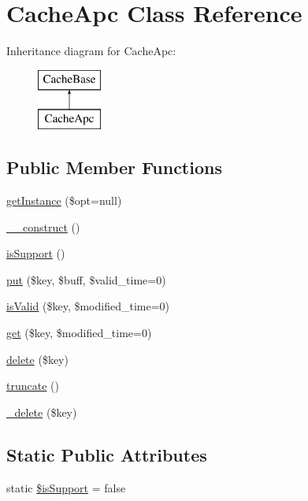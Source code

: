 \hypertarget{classCacheApc}{\section{Cache\-Apc Class Reference}
\label{classCacheApc}
}
Inheritance diagram for Cache\-Apc\-:\begin{figure}[H]
\begin{center}
\leavevmode
\includegraphics[height=2.000000cm]{classCacheApc}
\end{center}
\end{figure}
\subsection*{Public Member Functions}
\begin{DoxyCompactItemize}
\item 
\hyperlink{classCacheApc_ab175f6bbdebb9ce327c019c3be313331}{get\-Instance} (\$opt=null)
\item 
\hyperlink{classCacheApc_a3be647fd11c33de4fc5165e7840df318}{\-\_\-\-\_\-construct} ()
\item 
\hyperlink{classCacheApc_abd38db973d6d7188606a726d7a5fcc40}{is\-Support} ()
\item 
\hyperlink{classCacheApc_abdfbacf78bd79a1339b0fd37d97f399e}{put} (\$key, \$buff, \$valid\-\_\-time=0)
\item 
\hyperlink{classCacheApc_ae915c4aded713867d7fab9b691ab5795}{is\-Valid} (\$key, \$modified\-\_\-time=0)
\item 
\hyperlink{classCacheApc_ae4b086e28a3b2820174641e964844ceb}{get} (\$key, \$modified\-\_\-time=0)
\item 
\hyperlink{classCacheApc_a694a318a017e38de1fa758f557dbcb80}{delete} (\$key)
\item 
\hyperlink{classCacheApc_ad32f48b59d64b4f71fc0c61744468584}{truncate} ()
\item 
\hyperlink{classCacheApc_a14d5f6b3e8743ea43ad3307816cec95d}{\-\_\-delete} (\$key)
\end{DoxyCompactItemize}
\subsection*{Static Public Attributes}
\begin{DoxyCompactItemize}
\item 
static \hyperlink{classCacheApc_a337478fa933fb622e28f28b3baee3433}{\$is\-Support} = false
\end{DoxyCompactItemize}

